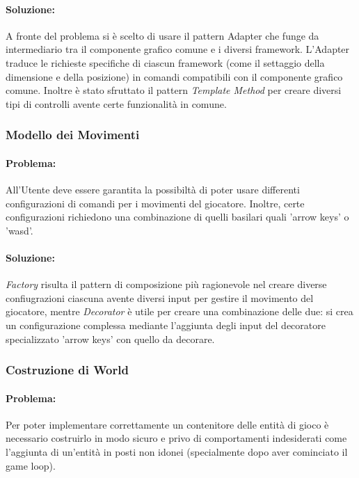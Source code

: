 \documentclass[a4paper,12pt]{report}
\begin{document}
	\paragraph{Soluzione:}A fronte del problema si è scelto di usare il pattern {Adapter} che funge da intermediario tra il componente grafico comune e i diversi framework. L'Adapter traduce le richieste specifiche di ciascun framework (come il settaggio della dimensione e della posizione) in comandi compatibili con il componente grafico comune. Inoltre è stato sfruttato il pattern \textit{Template Method} per creare diversi tipi di controlli avente certe funzionalità in comune.
	
	\subsubsection{Modello dei Movimenti}
	
	\paragraph{Problema:} All'Utente deve essere garantita la possibiltà di poter usare differenti configurazioni di comandi per i movimenti del giocatore. Inoltre, certe configurazioni richiedono una combinazione di quelli basilari quali 'arrow keys' o 'wasd'.
	
	\paragraph{Soluzione:} \textit{Factory} risulta il pattern di composizione più ragionevole nel creare diverse confiugrazioni ciascuna avente diversi input per gestire il movimento del giocatore, mentre \textit{Decorator} è utile per creare una combinazione delle due: si crea un configurazione complessa mediante l'aggiunta degli input del decoratore specializzato 'arrow keys' con quello da decorare.
	
	\subsubsection{Costruzione di World}
	
	\paragraph{Problema:} Per poter implementare correttamente un contenitore delle entità di gioco è necessario costruirlo in modo sicuro e privo di comportamenti indesiderati come l'aggiunta di un'entità in posti non idonei (specialmente dopo aver cominciato il game loop).
	
\end{document}
